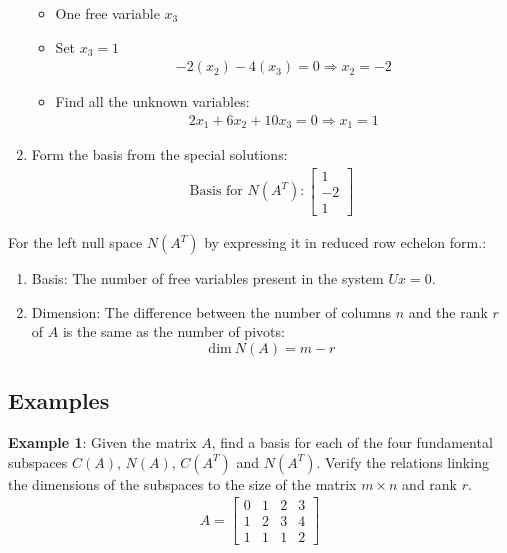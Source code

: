 \documentclass[10pt,a4paper]{article}
\begin{document}
\begin{enumerate}
\begin{itemize}
        \item One free variable $x_3$
        \item Set $x_3 = 1$
        \begin{align*}
            -2(x_2) -4(x_3) =0 \Rightarrow x_2 = -2
        \end{align*}
        \item Find all the unknown variables:
        \begin{align*}
            2x_1 + 6x_2 + 10x_3 = 0 \Rightarrow x_1 = 1
        \end{align*}
    \end{itemize}
    \item Form the basis from the special solutions:
        \begin{align*}
            \text{Basis for } N(A^T): 
            \begin{bmatrix}
                1 \\
                -2 \\
                1
            \end{bmatrix}
        \end{align*}
\end{enumerate}

\begin{tcolorbox}[breakable,colback=white]
    For the left null space $N(A^T)$ by expressing it in reduced row echelon form.:
    \begin{enumerate}
        \item Basis: The number of free variables present in the system $Ux=0$.
        \item Dimension: The difference between the number of columns $n$ and the rank $r$ of $A$ is the same as the number of pivots:
        $$
            \text{dim}\: N(A) = m - r
        $$
    \end{enumerate}
\end{tcolorbox}

\pagebreak
\subsection{Examples}

\textbf{Example 1}: Given the matrix $A$, ﬁnd a basis for each of the four fundamental subspaces
$C(A)$, $N(A)$, $C(A^T)$ and $N(A^T)$. Verify the relations linking the dimensions of the subspaces
to the size of the matrix $m \times n$ and rank $r$.
\begin{align*}
    A = 
    \begin{bmatrix}
        0&1&2&3 \\
        1&2&3&4 \\
        1&1&1&2
    \end{bmatrix}
\end{align*}
\end{document}
